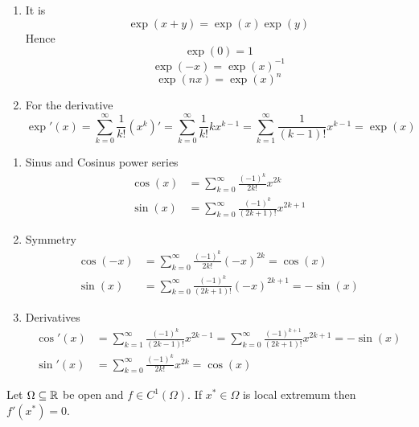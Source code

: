 \begin{lemma}\hfill
    \begin{enumerate}
        \item It is 
			\[ 
				\exp(x + y) = \exp(x)\exp(y) 
			\] 
			Hence 
			\[
				\exp(0) = 1
			\]
			\[
				\exp(-x) = \exp(x)^{-1}
			\]
			\[
				\exp(nx) = \exp(x)^n 
			\]
        \item For the derivative
			\[
				\exp'(x) = \sum_{k=0}^\infty \frac{1}{k!} (x^k)' = \sum_{k=0}^\infty \frac{1}{k!} kx^{k-1} 
					= \sum_{k=1}^\infty \frac{1}{(k-1)!} x^{k-1} = \exp(x)
			\]
    \end{enumerate}
\end{lemma}
\bigskip


\begin{lemma}\hfill
    \begin{enumerate}
        \item Sinus and Cosinus power series
			\[
				\begin{split}
					\cos(x) &= \sum_{k=0}^\infty \frac{(-1)^k}{2k!} x^{2k} \\
					\sin(x) &= \sum_{k=0}^\infty \frac{(-1)^k}{(2k + 1)!} x^{2k + 1}
				\end{split}
			\]
        \item Symmetry
			\[
				\begin{split}
					\cos(-x) &= \sum_{k=0}^\infty \frac{(-1)^k}{2k!} {(-x)}^{2k} = \cos(x) \\
					\sin(x) &= \sum_{k=0}^\infty \frac{(-1)^k}{(2k + 1)!} {(-x)}^{2k + 1} = -\sin(x)
				\end{split}
			\]
        \item Derivatives
			\[
				\begin{split}
					\cos'(x) &= \sum_{k=1}^\infty \frac{(-1)^k}{(2k - 1)!} x^{2k - 1}
						= \sum_{k=0}^\infty \frac{(-1)^{k + 1}}{(2k + 1)!} x^{2k + 1} = -\sin(x) \\
					\sin'(x) &= \sum_{k=0}^\infty \frac{(-1)^k}{2k!} {x}^{2k} = \cos(x)
				\end{split}
			\]
    \end{enumerate}
\end{lemma}
\bigskip


\begin{theorem}\label{thm:fermat_stationary_point}
Let \( \Omega \subseteq \mathbb{R} \) be open and \( f \in C^1(\Omega) \). If \( x^* \in \Omega \) is local extremum 
then \( f'(x^*) = 0 \).
\end{theorem}

